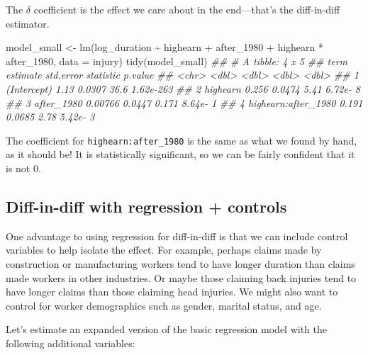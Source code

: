 \documentclass[
  letterpaper,
  DIV=11,
  numbers=noendperiod]{scrartcl}
\newenvironment{Shaded}{\begin{snugshade}}{\end{snugshade}}
\newcommand{\AttributeTok}[1]{\textcolor[rgb]{0.40,0.45,0.13}{#1}}
\newcommand{\DocumentationTok}[1]{\textcolor[rgb]{0.37,0.37,0.37}{\textit{#1}}}
\newcommand{\FunctionTok}[1]{\textcolor[rgb]{0.28,0.35,0.67}{#1}}
\newcommand{\NormalTok}[1]{\textcolor[rgb]{0.00,0.23,0.31}{#1}}
\newcommand{\OtherTok}[1]{\textcolor[rgb]{0.00,0.23,0.31}{#1}}
\newcommand{\SpecialCharTok}[1]{\textcolor[rgb]{0.37,0.37,0.37}{#1}}
\begin{document}
The \(\delta\) coefficient is the effect we care about in the
end---that's the diff-in-diff estimator.

\begin{Shaded}
\begin{Highlighting}[]
\NormalTok{model\_small }\OtherTok{\textless{}{-}} \FunctionTok{lm}\NormalTok{(log\_duration }\SpecialCharTok{\textasciitilde{}}\NormalTok{ highearn }\SpecialCharTok{+}\NormalTok{ after\_1980 }\SpecialCharTok{+}\NormalTok{ highearn }\SpecialCharTok{*}\NormalTok{ after\_1980,}
                  \AttributeTok{data =}\NormalTok{ injury)}
\FunctionTok{tidy}\NormalTok{(model\_small)}
\DocumentationTok{\#\# \# A tibble: 4 x 5}
\DocumentationTok{\#\#   term                estimate std.error statistic   p.value}
\DocumentationTok{\#\#   \textless{}chr\textgreater{}                  \textless{}dbl\textgreater{}     \textless{}dbl\textgreater{}     \textless{}dbl\textgreater{}     \textless{}dbl\textgreater{}}
\DocumentationTok{\#\# 1 (Intercept)          1.13       0.0307    36.6   1.62e{-}263}
\DocumentationTok{\#\# 2 highearn             0.256      0.0474     5.41  6.72e{-}  8}
\DocumentationTok{\#\# 3 after\_1980           0.00766    0.0447     0.171 8.64e{-}  1}
\DocumentationTok{\#\# 4 highearn:after\_1980  0.191      0.0685     2.78  5.42e{-}  3}
\end{Highlighting}
\end{Shaded}

The coefficient for \texttt{highearn:after\_1980} is the same as what we
found by hand, as it should be! It is statistically significant, so we
can be fairly confident that it is not 0.

\hypertarget{diff-in-diff-with-regression-controls}{%
\subsection{Diff-in-diff with regression +
controls}\label{diff-in-diff-with-regression-controls}}

One advantage to using regression for diff-in-diff is that we can
include control variables to help isolate the effect. For example,
perhaps claims made by construction or manufacturing workers tend to
have longer duration than claims made workers in other industries. Or
maybe those claiming back injuries tend to have longer claims than those
claiming head injuries. We might also want to control for worker
demographics such as gender, marital status, and age.

Let's estimate an expanded version of the basic regression model with
the following additional variables:
\end{document}

